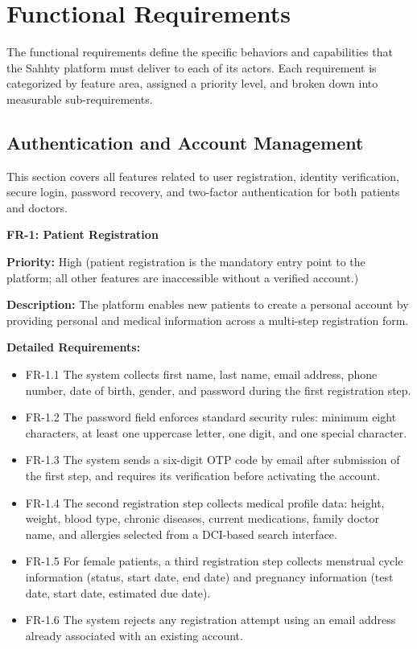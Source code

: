 \section{Functional Requirements}

The functional requirements define the specific behaviors and capabilities that the Sahhty
platform must deliver to each of its actors. Each requirement is categorized by feature
area, assigned a priority level, and broken down into measurable sub-requirements.

\subsection{Authentication and Account Management}

This section covers all features related to user registration, identity verification,
secure login, password recovery, and two-factor authentication for both patients and doctors.

\textbf{FR-1: Patient Registration}

\textbf{Priority:} High (patient registration is the mandatory entry point to the platform; all other features are inaccessible without a verified account.)

\textbf{Description:} The platform enables new patients to create a personal account by
providing personal and medical information across a multi-step registration form.

\textbf{Detailed Requirements:}
\begin{itemize}
    \item FR-1.1 \; The system collects first name, last name, email address, phone number,
    date of birth, gender, and password during the first registration step.
    \item FR-1.2 \; The password field enforces standard security rules: minimum eight
    characters, at least one uppercase letter, one digit, and one special character.
    \item FR-1.3 \; The system sends a six-digit OTP code by email after submission of
    the first step, and requires its verification before activating the account.
    \item FR-1.4 \; The second registration step collects medical profile data: height,
    weight, blood type, chronic diseases, current medications, family doctor name, and
    allergies selected from a DCI-based search interface.
    \item FR-1.5 \; For female patients, a third registration step collects menstrual cycle
    information (status, start date, end date) and pregnancy information (test date,
    start date, estimated due date).
    \item FR-1.6 \; The system rejects any registration attempt using an email address
    already associated with an existing account.
\end{itemize}

